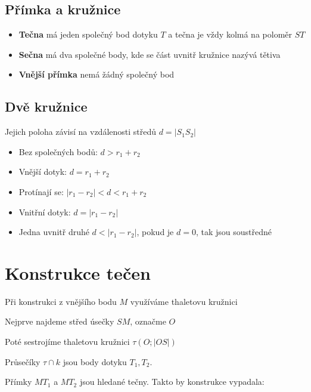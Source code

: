 \documentclass[12pt]{article}
\begin{document}
\subsection*{Přímka a kružnice}
\begin{itemize}
    \item \textbf{Tečna} má jeden společný bod dotyku $T$ a tečna je vždy kolmá na poloměr $ST$
    \item \textbf{Sečna} má dva společné body, kde se část uvnitř kružnice nazývá tětiva
    \item \textbf{Vnější přímka} nemá žádný společný bod
\end{itemize}

\subsection*{Dvě kružnice}
Jejich poloha závisí na vzdálenosti středů $d = |S_1 S_2|$
\begin{itemize}
    \item Bez společných bodů: $d> r_1 + r_2$
    \item Vnější dotyk: $d = r_1 + r_2$
    \item Protínají se: $|r_1 - r_2| < d < r_1 + r_2$
    \item Vnitřní dotyk: $d = |r_1 - r_2|$
    \item Jedna uvnitř druhé $d<|r_1 - r_2|$, pokud je $d = 0$, tak jsou soustředné
\end{itemize}

\section*{Konstrukce tečen}
Při konstrukci z vnějšího bodu $M$ využíváme thaletovu kružnici

Nejprve najdeme střed úsečky $SM$, označme $O$

Poté sestrojíme thaletovu kružnici $\tau(O;|OS|)$

Průsečíky $\tau \cap k$ jsou body dotyku $T_1, T_2$.

Přímky $MT_1$ a $MT_2$ jsou hledané tečny. Takto by konstrukce vypadala:
\end{document}
